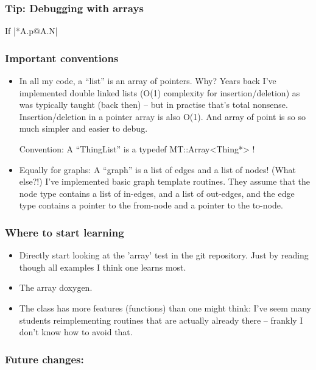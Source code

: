 \subsubsection{Tip: Debugging with arrays}

If |*A.p@A.N|


\subsubsection{Important conventions}

\begin{itemize}
\item In all my code, a ``list'' is an array of pointers. Why? Years back
   I've implemented double linked lists (O(1) complexity for
   insertion/deletion) as was typically taught (back then) -- but in
   practise that's total nonsense. Insertion/deletion in a pointer
   array is also O(1). And array of point is so so much simpler and
   easier to debug.

   Convention: A ``ThingList'' is a typedef MT::Array<Thing*> !

\item Equally for graphs: A ``graph'' is a list of edges and a list of
   nodes! (What else?!) I've implemented basic graph template
   routines. They assume that the node type contains a list of
   in-edges, and a list of out-edges, and the edge type contains a
   pointer to the from-node and a pointer to the to-node.
\end{itemize}

\subsubsection{Where to start learning}

\begin{itemize}
\item Directly start looking at the 'array' test in the git
repository. Just by reading though all examples I think one learns
most.

\item The array doxygen.

\item The class has more features (functions) than one might think: I've
seem many students reimplementing routines that are actually already
there -- frankly I don't know how to avoid that.
\end{itemize}


\subsubsection{Future changes:}

